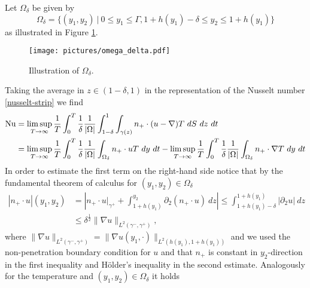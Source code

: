 \documentclass{article}
\theoremstyle{definition}
\theoremstyle{definition}
\newcommand{\Nu}{{\rm{Nu}}}
\begin{document}
Let $\Omega_\delta$ be given by $$\Omega_\delta = \lbrace (y_1,y_2) \ \vert \ 0\leq y_1\leq \Gamma, 1+h(y_1)-\delta\leq y_2\leq 1+h(y_1)\rbrace$$ as illustrated in Figure \ref{fig:omega_delta}.
\begin{figure}
    \begin{center}
        \texttt{[image: pictures/omega\_delta.pdf]}
    \end{center}
    \caption{Illustration of $\Omega_\delta$.}
    \label{fig:omega_delta}
\end{figure}
Taking the average in $z\in (1-\delta,1)$ in the representation of the Nusselt number \eqref{nusselt-strip} we find
\begin{equation}
    \label{halfBound-nusselt-on-Omega_delta}
    \begin{aligned}
        \Nu &= \limsup_{T\to\infty} \frac{1}{T}\int_0^T \frac{1}{\delta} \frac{1}{|\Omega|} \int_{1-\delta}^{1}\int_{\gamma(z)} n_+\cdot (u-\nabla)T \ dS\ dz\ dt 
        \\
        &= \limsup_{T\to\infty} \frac{1}{T}\int_0^T \frac{1}{\delta} \frac{1}{|\Omega|} \int_{\Omega_\delta} n_+\cdot u T \ dy\ dt - \limsup_{T\to\infty} \frac{1}{T}\int_0^T \frac{1}{\delta} \frac{1}{|\Omega|} \int_{\Omega_\delta} n_+\cdot \nabla T \ dy\ dt
    \end{aligned}
\end{equation}
In order to estimate the first term on the right-hand side notice that by the fundamental theorem of calculus for $(y_1,y_2)\in \Omega_\delta$
\begin{equation}
    \label{halfBound-velocity-term}
    \begin{aligned}
        |n_+\cdot u| (y_1,y_2)&= \left|n_+\cdot u\vert_{\gamma^+}+\int_{1+h(y_1)}^{y_2} \partial_2 (n_+\cdot u)\ dz\right| \leq  \int_{1+h(y_1)-\delta}^{1+h(y_1)} |\partial_2 u|\ dz 
        \\
        &\leq \delta^\frac{1}{2}\|\nabla u\|_{L^2(\gamma^-,\gamma^+)},
    \end{aligned}
\end{equation}
where $\| \nabla u\|_{L^2(\gamma^-,\gamma^+)}=\|\nabla u(y_1,\cdot)\|_{L^2(h(y_1),1+h(y_1))}$ and we used the non-penetration boundary condition for $u$ and that $n_+$ is constant in $y_2$-direction in the first inequality and Hölder's inequality in the second estimate. Analogously for the temperature and $(y_1,y_2)\in \Omega_\delta$ it holds
\end{document}
